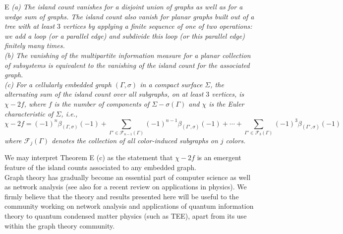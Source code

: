 \documentclass[10pt, reqno]{amsart}
\newcommand{\hf}{\hspace*{0.5cm}}
\theoremstyle{plain}
\theoremstyle{remark}
\theoremstyle{definition}
\numberwithin{equation}{section}
\begin{document}
\begin{customthm}{E}
{\it \textup{(a)} The island count vanishes for a disjoint union of graphs as well as for a wedge sum of graphs. The island count also vanish for planar graphs built out of a tree with at least $3$ vertices by applying a finite sequence of one of two operations: we add a loop (or a parallel edge) and subdivide this loop (or this parallel edge) finitely many times. \\
\textup{(b)} The vanishing of the multipartite information measure for a planar collection of subsystems is equivalent to the vanishing of the island count for the associated graph.\\
\textup{(c)} For a cellularly embedded graph $(\Gamma,\sigma)$ in a compact surface $\Sigma$, the alternating sum of the island count over all subgraphs, on at least $3$ vertices, is $\chi-2f$, where $f$ is the number of components of $\Sigma-\sigma(\Gamma)$ and $\chi$ is the Euler characteristic of $\Sigma$, i.e.,
$$\chi-2f=(-1)^n\beta_{(\Gamma,\sigma)}(-1) + \sum_{\Gamma'\in \mathscr{F}_{n-1}(\Gamma)}(-1)^{n-1}\beta_{(\Gamma',\sigma)}(-1)+\cdots+\sum_{\Gamma'\in \mathscr{F}_{3}(\Gamma)}(-1)^{3}\beta_{(\Gamma',\sigma)}(-1)
$$
where $\mathscr{F}_j(\Gamma)$ denotes the collection of all color-induced subgraphs on $j$ colors.}
\end{customthm}
\vspace*{-0.3cm}
We may interpret Theorem E (c) as the statement that $\chi-2f$ is an emergent feature of the island counts associated to any embedded graph.\\
\hf Graph theory has gradually become an essential part of computer science \cite{deo2017graph,riaz2011applications,majeed2020graph} as well as network analysis \cite{network_graph_barnes1983,network_graph_bernhardt2015network,network_graph_derrible2009network,network_graph_scott1988social} (see also \cite{battiston2021} for a recent review on applications in physics). We firmly believe that the theory and results presented here will be useful to the community working on network analysis and applications of quantum information theory to quantum condensed matter physics (such as TEE), apart from its use within the graph theory community.\\[-0.2cm]
\end{document}
